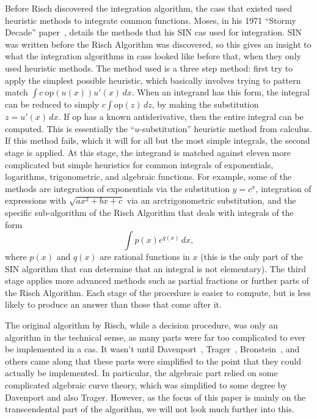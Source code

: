 Before Risch discovered the \gls{integration} algorithm, the \glspl{cas}
that existed used heuristic methods to integrate common functions.
Moses, in his 1971 ``Stormy Decade'' paper~\cite{moses1971symbolic},
details the methods that his SIN \gls{cas} used for integration. SIN was
written before the Risch Algorithm was discovered, so this gives an
insight to what the integration algorithms in \glspl{cas} looked like
before that, when they only used heuristic methods.  The method used is
a three step method: first try to apply the simplest possible heuristic,
which basically involves trying to pattern match $\int{c\
\mathrm{op}(u(x))u'(x)\,dx}$. When an \gls{integrand} has this form, the
integral can be reduced to simply $c\int{\mathrm{op}(z)\,dz}$, by making
the substitution $z=u'(x)\,dx$.  If $\mathrm{op}$ has a known
antiderivative, then the entire integral can be computed.  This is
essentially the ``$u$-substitution'' heuristic method from calculus.  If
this method fails, which it will for all but the most simple integrals,
the second stage is applied.  At this stage, the \gls{integrand} is
matched against eleven more complicated but simple heuristics for common
integrals of exponentials, logarithms, trigonometric, and
\gls{algebraic} functions.  For example, some of the methods are
\gls{integration} of exponentials via the substitution $y=c^x$,
integration of expressions with $\sqrt{ax^2 + bx + c}$ via an
arctrigonometric substitution, and the specific sub-algorithm of the
Risch Algorithm that deals with integrals of the form
\begin{equation}
\label{SIN exponential form}
\int{p(x)e^{q(x)}\,dx},
\end{equation}
where $p(x)$ and $q(x)$ are \glspl{rational function} in $x$ (this is
the only part of the SIN algorithm that can determine that an integral
is not \gls{elementary}). The third stage applies more advanced methods
such as partial fractions or further parts of the Risch Algorithm.  Each
stage of the procedure is easier to compute, but is less likely to
produce an answer than those that come after it.

The original algorithm by Risch, while a decision procedure, was only an
algorithm in the technical sense, as many parts were far too complicated
to ever be implemented in a \gls{cas}.  It wasn't until
Davenport~\cite{davenport1984integration},
Trager~\cite{trager1984integration},
Bronstein~\cite{bronstein2005symbolic}, and others came along that these
parts were simplified to the point that they could actually be
implemented.  In particular, the \gls{algebraic} part relied on some
complicated \gls{algebraic} curve theory, which was simplified to some degree
by Davenport and also Trager.  However, as the focus of this paper is
mainly on the \gls{transcendental} part of the algorithm, we will not
look much further into this.  